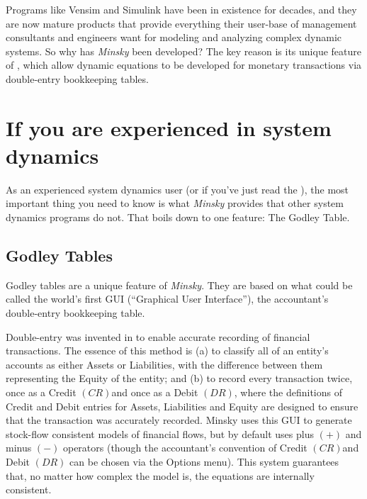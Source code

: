 Programs like Vensim and Simulink have been in existence for decades,
and they are now mature products that provide everything their user-base
of management consultants and engineers want for modeling and analyzing
complex dynamic systems. So why has \emph{Minsky} been developed?
The key reason is its unique feature of ,
which allow dynamic equations to be developed for monetary transactions
via double-entry bookkeeping tables.

\section{If you are experienced in system dynamics}

\label{intro:experienced-system-dynamics}

As an experienced system dynamics user (or if you've just read the
),
the most important thing you need to know is what \emph{Minsky} provides
that other system dynamics programs do not. That boils down to one
feature: The Godley Table. 

\subsection{Godley Tables}

\label{Godley-Tables}

Godley tables are a unique feature of \emph{Minsky}. They are based
on what could be called the world's first GUI (``Graphical User Interface''),
the accountant's double-entry bookkeeping table.

Double-entry was invented in 
to enable accurate recording of financial transactions. The essence
of this method is (a) to classify all of an entity's accounts as either
Assets or Liabilities, with the difference between them representing
the Equity of the entity; and (b) to record every transaction twice,
once as a Credit $\left(CR\right)$and once as a Debit $\left(DR\right)$,
where the definitions of Credit and Debit entries for Assets, Liabilities
and Equity are designed to ensure that the transaction was accurately
recorded. Minsky uses this GUI to generate stock-flow consistent models
of financial flows, but by default uses plus $\left(+\right)$ and
minus $\left(-\right)$ operators (though the accountant's convention
of Credit $\left(CR\right)$and Debit $\left(DR\right)$ can be chosen
via the Options menu). This system guarantees that, no matter how
complex the model is, the equations are internally consistent.

